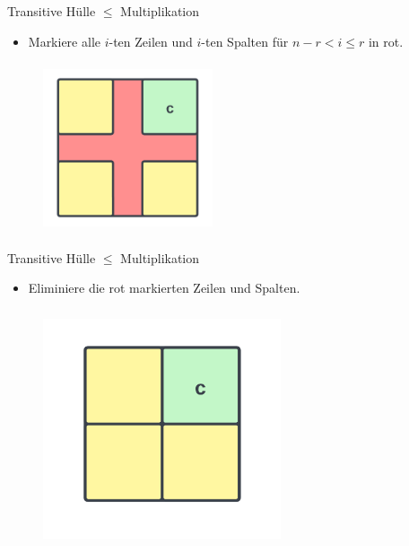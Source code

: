 \documentclass{beamer}
\begin{document}
	\begin{frame}{Transitive Hülle $\le$ Multiplikation}
		\begin{itemize}
			\item Markiere alle $i$-ten Zeilen und $i$-ten Spalten für $n-r < i \le r$ in rot. 
		\end{itemize} 		
		\begin{figure}
			\centering
			\includegraphics[width=5cm,height=5cm]{img/LGV6}
		\end{figure}
	\end{frame}

	\begin{frame}{Transitive Hülle $\le$ Multiplikation}
		\begin{itemize}
			\item Eliminiere die rot markierten Zeilen und Spalten. 
		\end{itemize} 
		\begin{figure}
			\centering
			\includegraphics[width=7cm,height=7cm]{img/LGV7}
		\end{figure}
	\end{frame}
\end{document}
